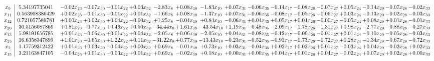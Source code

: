 \documentclass[9pt]{article}
\begin{document}
 \[\begin{array}{c| c c@{\hskip 2pt} c@{\hskip 2pt} c@{\hskip 2pt} c@{\hskip 2pt} c@{\hskip 2pt} c@{\hskip 2pt} c@{\hskip 2pt} c@{\hskip 2pt} c@{\hskip 2pt} c@{\hskip 2pt} c@{\hskip 2pt} c@{\hskip 2pt} c@{\hskip 2pt} c@{\hskip 2pt} c@{\hskip 2pt} c@{\hskip 2pt} }
 x_{9}   &  5.34197735041 & -0.02 x_{23} & -0.07 x_{30} & -0.01 x_{22} & +  0.03 x_{32} & -2.83 x_{8} & +  0.08 x_{18} & -1.83 x_{10} & +  0.07 x_{31} & -0.06 x_{35} & -0.14 x_{17} & -0.08 x_{26} & -0.07 x_{27} & +  0.05 x_{24} & -0.14 x_{29} & -0.07 x_{28} & -0.02 x_{33}\\
 x_{11}   &  0.563908386429 & +  0.02 x_{23} & -0.01 x_{30} & -0.01 x_{22} & +  0.01 x_{32} & -1.66 x_{8} & +  0.08 x_{18} & -1.37 x_{10} & +  0.07 x_{31} & -0.06 x_{35} & -0.08 x_{17} & -0.05 x_{26} & -0.06 x_{27} & +  0.03 x_{24} & -0.13 x_{29} & -0.02 x_{28} & -0.03 x_{33}\\
 x_{12}   &  0.721057589781 & +  0.00 x_{23} & +  0.02 x_{30} & +  0.04 x_{22} & -0.00 x_{32} & +  1.25 x_{8} & -0.04 x_{18} & +  0.84 x_{10} & -0.06 x_{31} & +  0.04 x_{35} & +  0.05 x_{17} & +  0.04 x_{26} & -0.00 x_{27} & -0.05 x_{24} & +  0.08 x_{29} & +  0.01 x_{28} & -0.01 x_{33}\\
 x_{20}   &  30.5156087866 & +  0.81 x_{23} & -0.77 x_{30} & +  0.46 x_{22} & +  0.50 x_{32} & -34.44 x_{8} & +  1.61 x_{18} & -43.54 x_{10} & +  1.19 x_{31} & -0.48 x_{35} & -2.09 x_{17} & -1.78 x_{26} & -1.31 x_{27} & +  0.98 x_{24} & -2.77 x_{29} & -0.88 x_{28} & -0.27 x_{33}\\
 x_{13}   &  5.98191656795 & +  0.01 x_{23} & -0.06 x_{30} & +  0.01 x_{22} & +  0.04 x_{32} & -2.05 x_{8} & +  0.06 x_{18} & -2.05 x_{10} & +  0.04 x_{31} & -0.08 x_{35} & -0.12 x_{17} & -0.06 x_{26} & -0.01 x_{27} & +  0.01 x_{24} & -0.10 x_{29} & -0.05 x_{28} & -0.03 x_{33}\\
 x_{25}   &  16.6358347899 & +  1.01 x_{23} & -0.65 x_{30} & +  1.22 x_{22} & +  0.11 x_{32} & -31.22 x_{8} & +  0.77 x_{18} & -13.43 x_{10} & -0.23 x_{31} & -0.52 x_{35} & -0.91 x_{17} & -0.73 x_{26} & -0.72 x_{27} & +  0.28 x_{24} & -1.34 x_{29} & -0.67 x_{28} & -0.72 x_{33}\\
 x_{2}   &  1.17759312422 & +  0.01 x_{23} & +  0.03 x_{30} & -0.04 x_{22} & +  0.00 x_{32} & +  0.69 x_{8} & -0.01 x_{18} & +  0.73 x_{10} & +  0.03 x_{31} & -0.04 x_{35} & +  0.02 x_{17} & +  0.02 x_{26} & +  0.01 x_{27} & -0.03 x_{24} & +  0.04 x_{29} & -0.02 x_{28} & +  0.02 x_{33}\\
 x_{15}   &  3.21163847105 & -0.04 x_{23} & +  0.01 x_{30} & -0.03 x_{22} & +  0.01 x_{32} & +  0.69 x_{8} & -0.02 x_{18} & +  0.18 x_{10} & +  0.00 x_{31} & +  0.00 x_{35} & +  0.04 x_{17} & +  0.01 x_{26} & +  0.04 x_{27} & -0.02 x_{24} & +  0.07 x_{29} & +  0.02 x_{28} & +  0.00 x_{33}\\

\end{array}\]
\end{document}
